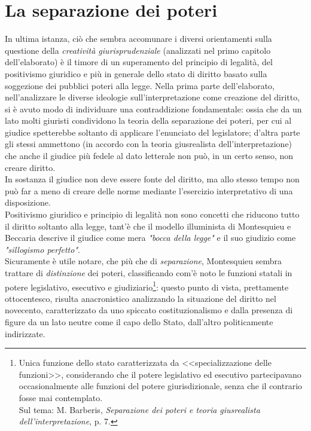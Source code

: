 \section{La separazione dei poteri}
In ultima istanza, ciò che sembra accomunare i diversi orientamenti sulla questione della \textit{creatività giurisprudenziale} (analizzati nel primo capitolo dell'elaborato) è il timore di un superamento del principio di legalità, del positivismo giuridico e più in generale dello stato di diritto basato sulla soggezione dei pubblici poteri alla legge.
Nella prima parte dell'elaborato, nell'analizzare le diverse ideologie sull'interpretazione come creazione del diritto, si è avuto modo di individuare una contraddizione fondamentale: ossia che da un lato molti giuristi condividono la teoria della separazione dei poteri, per cui al giudice spetterebbe soltanto di applicare l'enunciato del legislatore; d'altra parte gli stessi ammettono (in accordo con la teoria giusrealista dell'interpretazione) che anche il giudice più fedele al dato letterale non può, in un certo senso, non creare diritto.
\\In sostanza il giudice non deve essere fonte del diritto, ma allo stesso tempo non può far a meno di creare delle norme mediante l'esercizio interpretativo di una disposizione.
\\Positivismo giuridico e principio di legalità non sono concetti che riducono tutto il diritto soltanto alla legge, tant'è che il modello illuminista di Montesquieu e Beccaria descrive il giudice come mera \textit{"bocca della legge"} e il suo giudizio come \textit{"sillogismo perfetto"}. 
\\Sicuramente è utile notare, che più che di \textit{separazione}, Montesquieu sembra trattare di \textit{distinzione} dei poteri, classificando com'è noto le funzioni statali in potere legislativo, esecutivo e giudiziario\footnote{Unica funzione dello stato caratterizzata da <<specializzazione delle funzioni>>, considerando che il potere legislativo ed esecutivo partecipavano occasionalmente alle funzioni del potere giurisdizionale, senza che il contrario fosse mai contemplato.\\Sul tema: M. Barberis, \textit{Separazione dei poteri e teoria giusrealista dell'interpretazione}, p. 7.}: questo punto di vista, prettamente ottocentesco, risulta anacronistico analizzando la situazione del diritto nel novecento, caratterizzato da uno spiccato costituzionalismo e dalla presenza di figure da un lato neutre come il capo dello Stato, dall'altro politicamente indirizzate.
